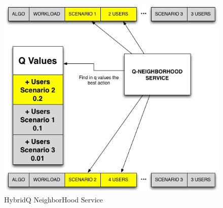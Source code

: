 \documentclass{bmcart}
\begin{document}
\begin{backmatter}
\begin{figure}[h!]
\begin{minipage}{.5\textwidth}
\includegraphics{./images/q-neighborservice.png}
\caption{HybridQ NeighborHood Service}
\label{fig:neighservice}
\end{minipage}
\end{figure}



\end{backmatter}
\end{document}
